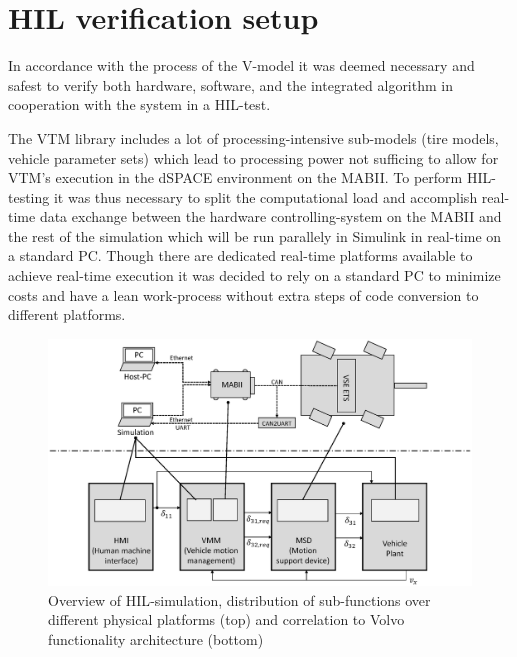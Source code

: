 \documentclass[root.tex]{subfiles}
\begin{document}
{\pagestyle{empty}}
\section{\gls{HIL} verification setup}
\label{chap:HiL-Architecture}



In accordance with the process of the V-model\cite{automotive_software_engineering} it was deemed necessary and safest to verify both hardware, software, and the integrated algorithm in cooperation with the system in a \gls{HIL}-test. 

The \gls{VTM} library includes a lot of processing-intensive sub-models (tire models, vehicle parameter sets) which lead to processing power not sufficing to allow for \gls{VTM}'s execution in the dSPACE environment on the \gls{MABII}. To perform \gls{HIL}-testing it was thus necessary to split the computational load and accomplish real-time data exchange between the hardware controlling-system on the \gls{MABII} and the rest of the simulation which will be run parallely in Simulink in real-time on a standard PC. Though there are dedicated real-time platforms available to achieve real-time execution it was decided to rely on a standard PC to minimize costs and have a lean work-process without extra steps of code conversion to different platforms.


\begin{figure}[tb]
	\centering
	\includegraphics[width=0.8\linewidth]{HIL_overview}
	\caption[Overview of \acrlong{HIL}-simulation, distribution of sub-functions over different physical platforms (top) and correlation to Volvo functionality architecture (bottom)]{Overview of \gls{HIL}-simulation, distribution of sub-functions over different physical platforms (top) and correlation to Volvo functionality architecture (bottom)}
	
	\label{fig:HIL_overview}
\end{figure}
\end{document}
